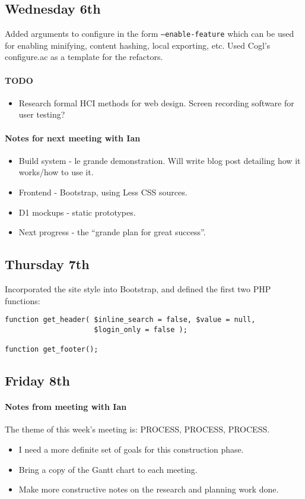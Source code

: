 \subsection{Wednesday 6th}
Added arguments to configure in the form \texttt{--enable-feature} which can be
used for enabling minifying, content hashing, local exporting, etc. Used Cogl's
configure.ac as a template for the refactors.

\paragraph{TODO}
\begin{itemize}
\item Research formal HCI methods for web design. Screen recording software for
  user testing?
\end{itemize}

\paragraph{Notes for next meeting with Ian}
\begin{itemize}
\item Build system - le grande demonstration. Will write blog post detailing how
  it works/how to use it.
\item Frontend - Bootstrap, using Less CSS sources.
\item D1 mockups - static prototypes.
\item Next progress - the ``grande plan for great success''.
\end{itemize}

\subsection{Thursday 7th}
Incorporated the site style into Bootstrap, and defined the first two PHP
functions:

\begin{verbatim}
function get_header( $inline_search = false, $value = null,
                     $login_only = false );

function get_footer();
\end{verbatim}

\subsection{Friday 8th}
\paragraph{Notes from meeting with Ian} The theme of this week's meeting is: PROCESS, PROCESS, PROCESS.
\begin{itemize}
\item I need a more definite set of goals for this construction phase.
\item Bring a copy of the Gantt chart to each meeting.
\item Make more constructive notes on the research and planning work done.
\end{itemize}

